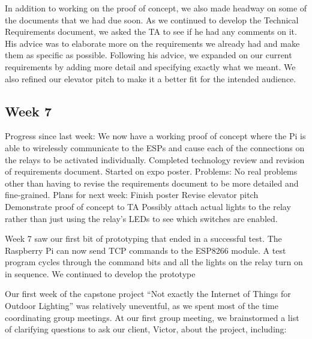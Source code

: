\documentclass[letterpaper,10pt]{article}
\begin{document}
In addition to working on the proof of concept, we also made headway on some of the documents that we had due soon. As we continued to develop the Technical Requirements document, we asked the TA to see if he had any comments on it. His advice was to elaborate more on the requirements we already had and make them as specific as possible. Following his advice, we expanded on our current requirements by adding more detail and specifying exactly what we meant. We also refined our elevator pitch to make it a better fit for the intended audience.

\subsection{Week 7}

Progress since last week: 
We now have a working proof of concept where the Pi is able to wirelessly communicate to the ESPs and cause each of the connections on the relays to be activated individually. 
Completed technology review and revision of requirements document. 
Started on expo poster. 
Problems: 
No real problems other than having to revise the requirements document to be more detailed and fine-grained. 
Plans for next week: 
Finish poster 
Revise elevator pitch 
Demonstrate proof of concept to TA 
Possibly attach actual lights to the relay rather than just using the relay's LEDs to see which switches are enabled. 

Week 7 saw our first bit of prototyping that ended in a successful test. The Raspberry Pi can now send TCP commands to the ESP8266 module. A test program cycles through the command bits and all the lights on the relay turn on in sequence. We continued to develop the prototype  

Our first week of the capstone project ``Not exactly the Internet of Things for
Outdoor Lighting'' was relatively uneventful, as we spent most of the time
coordinating group meetings.  At our first group meeting, we brainstormed a
list of clarifying questions to ask our client, Victor, about the project,
including:
\end{document}
